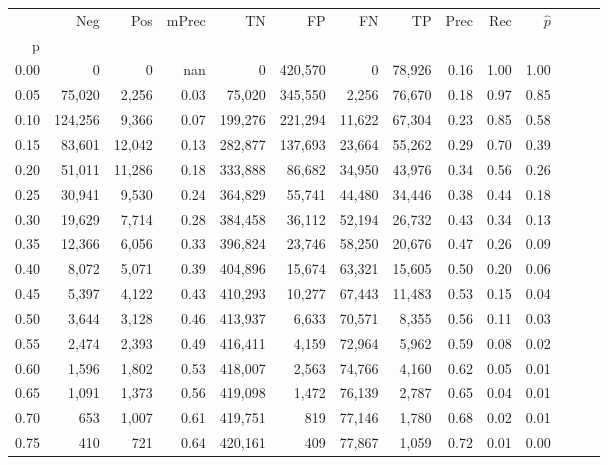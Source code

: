 \begin{tabular}{rrrrrrrrrrrrrr}
\toprule
{} &      Neg &     Pos & mPrec &       TN &       FP &      FN &      TP &  Prec &   Rec & $\hat{p}$ \\
p    &          &         &       &          &          &         &         &       &       &           \\
\midrule
0.00 &        0 &       0 &   nan &        0 &  420,570 &       0 &  78,926 &  0.16 &  1.00 &      1.00 \\
0.05 &   75,020 &   2,256 &  0.03 &   75,020 &  345,550 &   2,256 &  76,670 &  0.18 &  0.97 &      0.85 \\
0.10 &  124,256 &   9,366 &  0.07 &  199,276 &  221,294 &  11,622 &  67,304 &  0.23 &  0.85 &      0.58 \\
0.15 &   83,601 &  12,042 &  0.13 &  282,877 &  137,693 &  23,664 &  55,262 &  0.29 &  0.70 &      0.39 \\
0.20 &   51,011 &  11,286 &  0.18 &  333,888 &   86,682 &  34,950 &  43,976 &  0.34 &  0.56 &      0.26 \\
0.25 &   30,941 &   9,530 &  0.24 &  364,829 &   55,741 &  44,480 &  34,446 &  0.38 &  0.44 &      0.18 \\
0.30 &   19,629 &   7,714 &  0.28 &  384,458 &   36,112 &  52,194 &  26,732 &  0.43 &  0.34 &      0.13 \\
0.35 &   12,366 &   6,056 &  0.33 &  396,824 &   23,746 &  58,250 &  20,676 &  0.47 &  0.26 &      0.09 \\
0.40 &    8,072 &   5,071 &  0.39 &  404,896 &   15,674 &  63,321 &  15,605 &  0.50 &  0.20 &      0.06 \\
0.45 &    5,397 &   4,122 &  0.43 &  410,293 &   10,277 &  67,443 &  11,483 &  0.53 &  0.15 &      0.04 \\
0.50 &    3,644 &   3,128 &  0.46 &  413,937 &    6,633 &  70,571 &   8,355 &  0.56 &  0.11 &      0.03 \\
0.55 &    2,474 &   2,393 &  0.49 &  416,411 &    4,159 &  72,964 &   5,962 &  0.59 &  0.08 &      0.02 \\
0.60 &    1,596 &   1,802 &  0.53 &  418,007 &    2,563 &  74,766 &   4,160 &  0.62 &  0.05 &      0.01 \\
0.65 &    1,091 &   1,373 &  0.56 &  419,098 &    1,472 &  76,139 &   2,787 &  0.65 &  0.04 &      0.01 \\
0.70 &      653 &   1,007 &  0.61 &  419,751 &      819 &  77,146 &   1,780 &  0.68 &  0.02 &      0.01 \\
0.75 &      410 &     721 &  0.64 &  420,161 &      409 &  77,867 &   1,059 &  0.72 &  0.01 &      0.00 \\

\end{tabular}
